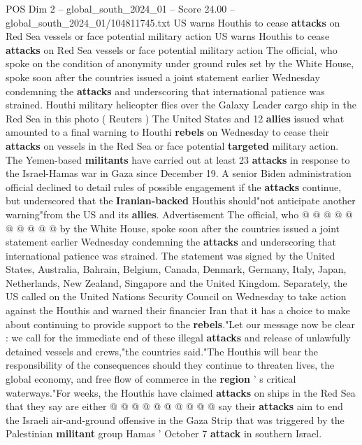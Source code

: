 \begin{textsample}{POS Dim 2 – global\_south\_2024\_01 – Score 24.00 – global\_south\_2024\_01/104811745.txt}  \label{ex:f2_pos_095}
US warns Houthis to cease \textbf{attacks} on Red Sea vessels or face potential military action US warns Houthis to cease \textbf{attacks} on Red Sea vessels or face potential military action The official, who spoke on the condition of anonymity under ground rules set by the White House, spoke soon after the countries issued a joint statement earlier Wednesday condemning the \textbf{attacks} and underscoring that international patience was strained.
Houthi military helicopter flies over the Galaxy Leader cargo ship in the Red Sea in this photo ( Reuters ) The United States and 12 \textbf{allies} issued what amounted to a final warning to Houthi \textbf{rebels} on Wednesday to cease their \textbf{attacks} on vessels in the Red Sea or face potential \textbf{targeted} military action.
The Yemen-based \textbf{militants} have carried out at least 23 \textbf{attacks} in response to the Israel-Hamas war in Gaza since December 19.
A senior Biden administration official declined to detail rules of possible engagement if the \textbf{attacks} continue, but underscored that the \textbf{Iranian-backed} Houthis should"not anticipate another warning"from the US and its \textbf{allies}.
Advertisement The official, who @ @ @ @ @ @ @ @ @ @ by the White House, spoke soon after the countries issued a joint statement earlier Wednesday condemning the \textbf{attacks} and underscoring that international patience was strained.
The statement was signed by the United States, Australia, Bahrain, Belgium, Canada, Denmark, Germany, Italy, Japan, Netherlands, New Zealand, Singapore and the United Kingdom.
Separately, the US called on the United Nations Security Council on Wednesday to take action against the Houthis and warned their financier Iran that it has a choice to make about continuing to provide support to the \textbf{rebels}."Let our message now be clear : we call for the immediate end of these illegal \textbf{attacks} and release of unlawfully detained vessels and crews,"the countries said."The Houthis will bear the responsibility of the consequences should they continue to threaten lives, the global economy, and free flow of commerce in the \textbf{region} ' s critical waterways."For weeks, the Houthis have claimed \textbf{attacks} on ships in the Red Sea that they say are either @ @ @ @ @ @ @ @ @ @ say their \textbf{attacks} aim to end the Israeli air-and-ground offensive in the Gaza Strip that was triggered by the Palestinian \textbf{militant} group Hamas ' October 7 \textbf{attack} in southern Israel.

\end{textsample}
